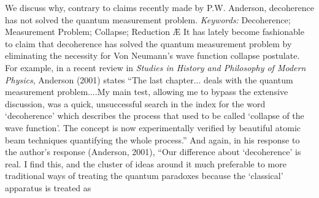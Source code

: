 \newdimen\fullhsize
\newbox\leftcolumn
\def\twoup{\hoffset=-.5in \voffset=-.25in
  \hsize=4.75in \fullhsize=10in \vsize=6.9in
  \def\fullline{\hbox to\fullhsize}
  \let\lr=L
  \output={\if L\lr
        \global\setbox\leftcolumn=\columnbox\global\let\lr=R \advancepageno
      \else \doubleformat \global\let\lr=L\fi
    \ifnum\outputpenalty>-20000 \else\dosupereject\fi}
  \def\doubleformat{\shipout\vbox{
    \fullline{\box\leftcolumn\hfil\columnbox}\advancepageno}}
  \def\columnbox{\leftline{\vbox{\makeheadline\pagebody\makefootline}}}
  \tolerance=1000 }
\overfullrule=0pt
\twelvepoint
\doublespace
{}
\vfill\eject
{}
\AB
We discuss why, contrary to claims recently made by P.W. Anderson,  
decoherence has not solved the quantum measurement problem.  
\bigskip
\bigskip
{\it Keywords:}  Decoherence; Measurement Problem; Collapse; 
Reduction
\AE
\vfill \eject
It has lately become fashionable to claim that decoherence has solved 
the quantum measurement problem by eliminating the necessity for
Von Neumann's wave function collapse postulate.  For example, in 
a recent review in 
{\it  Studies in History and Philosophy of
Modern Physics},  Anderson (2001) 
states ``The last chapter...
deals with the quantum measurement problem....My main test, allowing me to 
bypass the extensive discussion, was a quick, unsuccessful search in the 
index for the word `decoherence' which describes the process that used to 
be called `collapse of the wave function'.  The concept is now 
experimentally verified by beautiful atomic beam techniques quantifying the 
whole process.''  And again, in his response to the author's response  
(Anderson, 2001),  
``Our difference about `decoherence' is real.  I find this, and the cluster
of ideas around it much preferable to more traditional ways of treating 
the quantum paradoxes because the `classical' apparatus is treated as 

